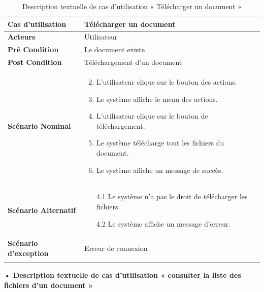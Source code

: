 \begin{longtable}{|p{5cm}|p{10cm}|}
\hline
\textbf{Cas d'utilisation}& Télécharger un document\\
\hline
\textbf{Acteurs}&Utilisateur\\
\hline
\textbf{Pré Condition}&Le document existe\\
\hline
\textbf{Post Condition}&Téléchargement d'un document\\
\hline
\textbf{Scénario Nominal}&
\vspace{-\baselineskip}
\begin{enumerate}
    \setcounter{enumi}{1}
    \item L'utilisateur clique sur le bouton des actions.
    \item Le système affiche le menu des actions.
    \item L'utilisateur clique sur le bouton de téléchargement.
    \item Le système télécharge tout les fichiers du document.
    \item Le système affiche un message de succès.
\end{enumerate}\\
\hline
\textbf{Scénario Alternatif}&
\vspace{-\baselineskip}
\begin{enumerate}
  \item [4.1] Le système n'a pas le droit de télécharger les fichiers.
  \item [4.2] Le système affiche un message d'erreur.
\end{enumerate}\\
\hline
\textbf{Scénario d'exception}&Erreur de connexion\\
\hline
\caption{Description textuelle de cas d'utilisation « Télécharger un document »}
\label{tab:DescriptionTextuelleDeCasDUtilisationTéléchargerUnDocument}
\end{longtable}


\textbf{•	Description textuelle de cas d'utilisation « consulter la liste des fichiers d'un document »}

